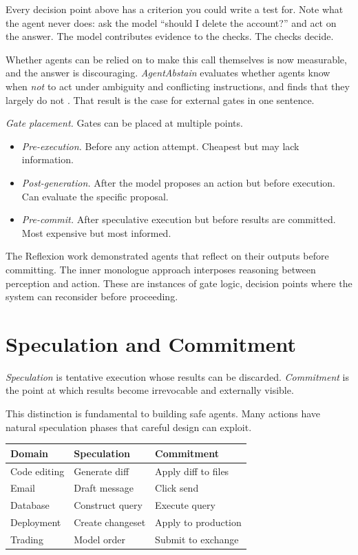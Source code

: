 Every decision point above has a criterion you could write a test for. Note what the agent never does: ask the model ``should I delete the account?'' and act on the answer. The model contributes evidence to the checks. The checks decide.

Whether agents can be relied on to make this call themselves is now measurable, and the answer is discouraging. \emph{AgentAbstain} evaluates whether agents know when \emph{not} to act under ambiguity and conflicting instructions, and finds that they largely do not \cite{agentabstain2026}. That result is the case for external gates in one sentence.

\textit{Gate placement.} Gates can be placed at multiple points.

\begin{itemize}
\item \textit{Pre-execution.} Before any action attempt. Cheapest but may lack information.
\item \textit{Post-generation.} After the model proposes an action but before execution. Can evaluate the specific proposal.
\item \textit{Pre-commit.} After speculative execution but before results are committed. Most expensive but most informed.
\end{itemize}

The Reflexion work \cite{shinn2023reflexion} demonstrated agents that reflect on their outputs before committing. The inner monologue approach \cite{huang2022inner} interposes reasoning between perception and action. These are instances of gate logic, decision points where the system can reconsider before proceeding.

\section{Speculation and Commitment}

\emph{Speculation} is tentative execution whose results can be discarded. \emph{Commitment} is the point at which results become irrevocable and externally visible.

This distinction is fundamental to building safe agents. Many actions have natural speculation phases that careful design can exploit.

\begin{center}
\begin{tabular}{lll}
\toprule
Domain & Speculation & Commitment \\
\midrule
Code editing & Generate diff & Apply diff to files \\
Email & Draft message & Click send \\
Database & Construct query & Execute query \\
Deployment & Create changeset & Apply to production \\
Trading & Model order & Submit to exchange \\
\bottomrule
\end{tabular}
\end{center}


